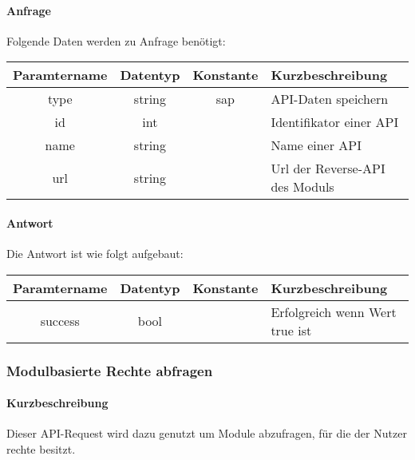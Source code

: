 \paragraph{Anfrage}Folgende Daten werden zu Anfrage benötigt:
\begin{table}[H]
	\begin{tabular}{|c|c|c|p{6.5cm}|}
		\hline
		\textbf{Paramtername} & \textbf{Datentyp} & \textbf{Konstante} & \textbf{Kurzbeschreibung}                                                                                               \\ \hline
		type                & string            & sap                & API-Daten speichern \\ \hline
		id                  & int               &                    & Identifikator einer API \\ \hline
		name                & string            &                    & Name einer API \\ \hline
		url                 & string            &                    & Url der Reverse-API des Moduls \\ \hline
	\end{tabular}
\end{table}
\paragraph{Antwort}Die Antwort ist wie folgt aufgebaut:
\begin{table}[H]
	\begin{tabular}{|c|c|c|p{6.5cm}|}
		\hline
		\textbf{Paramtername} & \textbf{Datentyp} & \textbf{Konstante} & \textbf{Kurzbeschreibung}            \\ \hline                
		success             & bool             &                 & Erfolgreich wenn Wert {\glqq true\grqq} ist \\ \hline
	\end{tabular}
\end{table}
\subsubsection{Modulbasierte Rechte abfragen}
\paragraph{Kurzbeschreibung}Dieser API-Request wird dazu genutzt um Module abzufragen, für die der Nutzer rechte besitzt.
